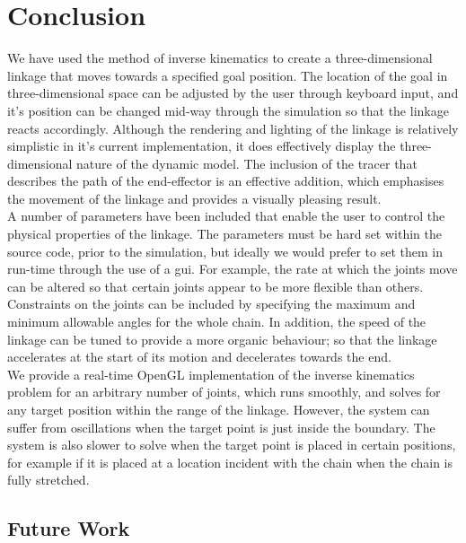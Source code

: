 \documentclass[paper=a4, fontsize=11pt]{scrartcl} %
\numberwithin{equation}{section} %
\numberwithin{figure}{section} %
\numberwithin{table}{section} %
\begin{document}
\section{Conclusion}

We have used the method of inverse kinematics to create a three-dimensional linkage that moves towards a specified goal position. The location of the goal in three-dimensional space can be adjusted by the user through keyboard input, and it's position can be changed mid-way through the simulation so that the linkage reacts accordingly. Although the rendering and lighting of the linkage is relatively simplistic in it's current implementation, it does effectively display the three-dimensional nature of the dynamic model. The inclusion of the tracer that describes the path of the end-effector is an effective addition, which emphasises the movement of the linkage and provides a visually pleasing result. \\

A number of parameters have been included that enable the user to control the physical properties of the linkage. The parameters must be hard set within the source code, prior to the simulation, but ideally we would prefer to set them in run-time through the use of a gui. For example, the rate at which the joints move can be altered so that certain joints appear to be more flexible than others. Constraints on the joints can be included by specifying the maximum and minimum allowable angles for the whole chain. In addition, the speed of the linkage can be tuned to provide a more organic behaviour; so that the linkage accelerates at the start of its motion and decelerates towards the end. \\

We provide a real-time OpenGL implementation of the inverse kinematics problem for an arbitrary number of joints, which runs smoothly, and solves for any target position within the range of the linkage. However, the system can suffer from oscillations when the target point is just inside the boundary. The system is also slower to solve when the target point is placed in certain positions, for example if it is placed at a location incident with the chain when the chain is fully stretched.

\subsection{Future Work}
\end{document}
